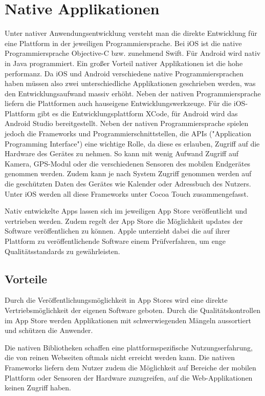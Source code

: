 \section{Native Applikationen}
\label{sec:nativeApplikationen}
%
Unter nativer Anwendungsentwicklung versteht man die direkte Entwicklung für eine Plattform in der jeweiligen Programmiersprache. Bei iOS ist die native Programmiersprache Objective-C bzw. zunehmend Swift. Für Android wird nativ in Java programmiert. Ein großer Vorteil nativer Applikationen ist die hohe performanz. Da iOS und Android verschiedene native Programmiersprachen haben müssen also zwei unterschiedliche Applikationen geschrieben werden, was den Entwicklungsaufwand massiv erhöht.
Neben der nativen Programmiersprache liefern die Plattformen auch hauseigene Entwicklungswerkzeuge. Für die iOS-Plattform gibt es die Entwicklungsplattform XCode, für Android wird das Android Studio bereitgestellt. Neben der nativen Programmiersprache spielen jedoch die Frameworks und Programmierschnittstellen, die APIs ("Application Programming Interface") eine wichtige Rolle, da diese es erlauben, Zugriff auf die Hardware des Gerätes zu nehmen. So kann mit wenig Aufwand Zugriff auf Kamera, GPS-Modul oder die verschiedenen Sensoren des mobilen Endgerätes genommen werden. Zudem kann je nach System Zugriff genommen werden auf die geschützten Daten des Gerätes wie Kalender oder Adressbuch des Nutzers. Unter iOS werden all diese Frameworks unter Cocoa Touch zusammengefasst.

Nativ entwickelte Apps lassen sich im jeweiligen App Store veröffentlicht und vertrieben werden. Zudem regelt der App Store die Möglichkeit updates der Software veröffentlichen zu können. Apple unterzieht dabei die auf ihrer Plattform zu veröffentlichende Software einem Prüfverfahren, um enge Qualitätsstandards zu gewährleisten. \cite{appleReview} 
%
\subsection{Vorteile}
%
Durch die Veröffentlichungsmöglichkeit in App Stores wird eine direkte Vertriebsmöglichkeit der eigenen Software geboten. Durch die Qualitätskontrollen im App Store werden Applikationen mit schwerwiegenden Mängeln aussortiert und schützen die Anwender.

Die nativen Bibliotheken schaffen eine plattformspezifische Nutzungserfahrung, die von reinen Webseiten oftmals nicht erreicht werden kann. Die nativen Frameworks liefern dem Nutzer zudem die Möglichkeit auf Bereiche der mobilen Plattform oder Sensoren der Hardware zuzugreifen, auf die Web-Applikationen keinen Zugriff haben.

